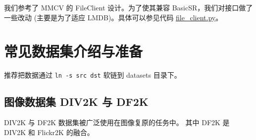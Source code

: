 \documentclass[../main.tex]{subfiles}
\begin{document}
我们参考了 MMCV 的 FileClient 设计。为了使其兼容 BasicSR，我们对接口做了一些改动 (主要是为了适应 LMDB)。具体可以参见代码 \href{https://github.com/XPixelGroup/BasicSR/blob/master/basicsr/utils/file_client.py}{file\_client.py}。


\section{常见数据集介绍与准备}\label{data_preparation:dataset}

推荐把数据通过 \texttt{ln -s src dst} 软链到 datasets 目录下。

\subsection{图像数据集 DIV2K 与 DF2K}

DIV2K 与 DF2K 数据集被广泛使用在图像复原的任务中。
其中 DF2K 是 DIV2K 和 Flickr2K 的融合。
\end{document}
